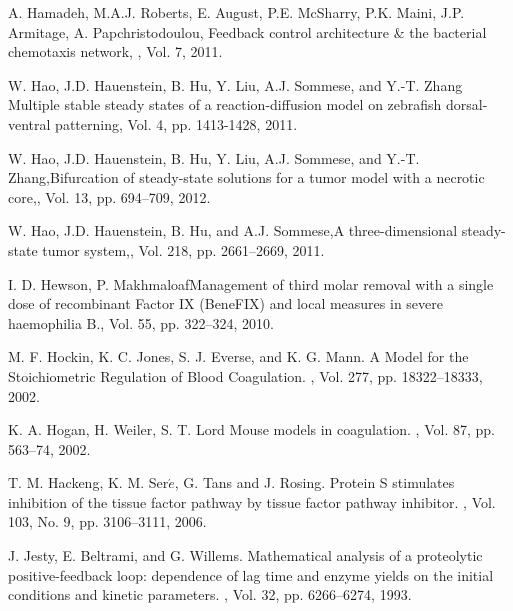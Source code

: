 \begin{thebibliography}{99}
\newblock A. Hamadeh, M.A.J. Roberts, E. August, P.E. McSharry, P.K. Maini,
J.P. Armitage, \newblock A. Papchristodoulou, Feedback control
architecture \& the bacterial chemotaxis network, , Vol. 7, 2011.



 W. Hao, J.D. Hauenstein, B.
   Hu, Y. Liu, A.J.
   Sommese, and Y.-T. Zhang \newblock Multiple stable
   steady
   states of
   a reaction-diffusion model on zebrafish
   dorsal-ventral
   patterning, Vol. 4, pp. 1413-1428, 2011.

  W. Hao, J.D. Hauenstein, B.
   Hu, Y. Liu, A.J.
   Sommese, and Y.-T. Zhang,\newblock Bifurcation of
   steady-state solutions for a
tumor model with a necrotic core,, Vol. 13, pp. 694--709, 2012.

  W. Hao, J.D. Hauenstein, B.
   Hu, and A.J.
   Sommese,\newblock A three-dimensional steady-state
   tumor system,,
   Vol. 218, pp. 2661--2669, 2011.

I. D. Hewson, P. Makhmaloaf\newblock Management of third molar
removal with a single dose of recombinant Factor IX (BeneFIX) and
local measures in severe haemophilia B., Vol. 55, pp. 322--324, 2010.

 M. F. Hockin, K. C. Jones, S. J. Everse, and K. G. Mann.
\newblock A Model for the Stoichiometric Regulation of Blood
Coagulation.
, Vol. 277, pp. 18322--18333, 2002.

 K. A. Hogan, H. Weiler, S. T. Lord \newblock Mouse models in coagulation. , Vol. 87,  pp. 563--74, 2002.

 T. M. Hackeng, K. M. Ser$\acute{e}$, G. Tans and J. Rosing.
\newblock Protein S stimulates inhibition of the tissue factor pathway by tissue factor pathway inhibitor.
, Vol. 103, No. 9,  pp. 3106--3111, 2006.

J. Jesty, E. Beltrami, and G. Willems.
\newblock Mathematical analysis of a proteolytic positive-feedback loop: dependence
of lag time and enzyme yields on the initial conditions and kinetic
parameters.
, Vol. 32, pp. 6266--6274, 1993.


\end{thebibliography}
